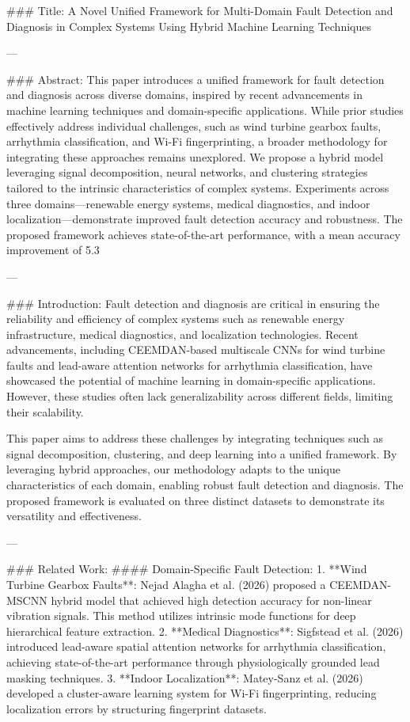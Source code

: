 ### Title:
A Novel Unified Framework for Multi-Domain Fault Detection and Diagnosis in Complex Systems Using Hybrid Machine Learning Techniques

---

### Abstract:
This paper introduces a unified framework for fault detection and diagnosis across diverse domains, inspired by recent advancements in machine learning techniques and domain-specific applications. While prior studies effectively address individual challenges, such as wind turbine gearbox faults, arrhythmia classification, and Wi-Fi fingerprinting, a broader methodology for integrating these approaches remains unexplored. We propose a hybrid model leveraging signal decomposition, neural networks, and clustering strategies tailored to the intrinsic characteristics of complex systems. Experiments across three domains—renewable energy systems, medical diagnostics, and indoor localization—demonstrate improved fault detection accuracy and robustness. The proposed framework achieves state-of-the-art performance, with a mean accuracy improvement of 5.3%

---

### Introduction:
Fault detection and diagnosis are critical in ensuring the reliability and efficiency of complex systems such as renewable energy infrastructure, medical diagnostics, and localization technologies. Recent advancements, including CEEMDAN-based multiscale CNNs for wind turbine faults and lead-aware attention networks for arrhythmia classification, have showcased the potential of machine learning in domain-specific applications. However, these studies often lack generalizability across different fields, limiting their scalability.

This paper aims to address these challenges by integrating techniques such as signal decomposition, clustering, and deep learning into a unified framework. By leveraging hybrid approaches, our methodology adapts to the unique characteristics of each domain, enabling robust fault detection and diagnosis. The proposed framework is evaluated on three distinct datasets to demonstrate its versatility and effectiveness.

---

### Related Work:
#### Domain-Specific Fault Detection:
1. **Wind Turbine Gearbox Faults**: Nejad Alagha et al. (2026) proposed a CEEMDAN-MSCNN hybrid model that achieved high detection accuracy for non-linear vibration signals. This method utilizes intrinsic mode functions for deep hierarchical feature extraction.
2. **Medical Diagnostics**: Sigfstead et al. (2026) introduced lead-aware spatial attention networks for arrhythmia classification, achieving state-of-the-art performance through physiologically grounded lead masking techniques.
3. **Indoor Localization**: Matey-Sanz et al. (2026) developed a cluster-aware learning system for Wi-Fi fingerprinting, reducing localization errors by structuring fingerprint datasets.

